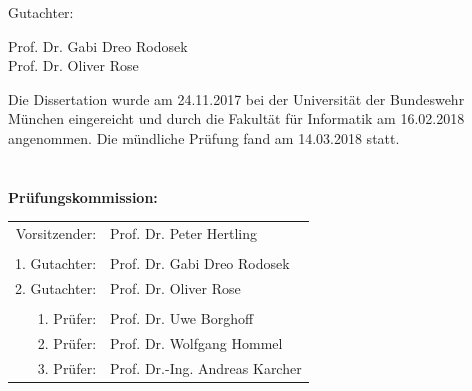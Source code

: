 \begin{titlepage}
    \vspace*{0.5cm}
    
    \begin{center}
        \Large
        Gutachter:
        
        \vspace{0.3cm}
        
        Prof. Dr. Gabi Dreo Rodosek\\
        Prof. Dr. Oliver Rose
    \end{center}
    
    \vfill
    
    \Large
    Die Dissertation wurde am 24.11.2017 bei der Universität der Bundeswehr München eingereicht und durch die Fakultät für Informatik am 16.02.2018 angenommen. Die mündliche Prüfung fand am 14.03.2018 statt.
    
    \vspace{0.5cm}
\end{titlepage}

\restoregeometry

\thispagestyle{plain}
\section*{ }

\begin{center}
    \Large
    \textbf{Prüfungskommission:}
    
    \vspace{1cm}
    
    \begin{tabular}{rl}
        Vorsitzender: & Prof. Dr. Peter Hertling \\
        & \\
        1. Gutachter: & Prof. Dr. Gabi Dreo Rodosek\\
        2. Gutachter: & Prof. Dr. Oliver Rose\\
        & \\
        1. Prüfer: & Prof. Dr. Uwe Borghoff\\
        2. Prüfer: & Prof. Dr. Wolfgang Hommel\\
        3. Prüfer: & Prof. Dr.-Ing. Andreas Karcher\\
    \end{tabular}
\end{center}